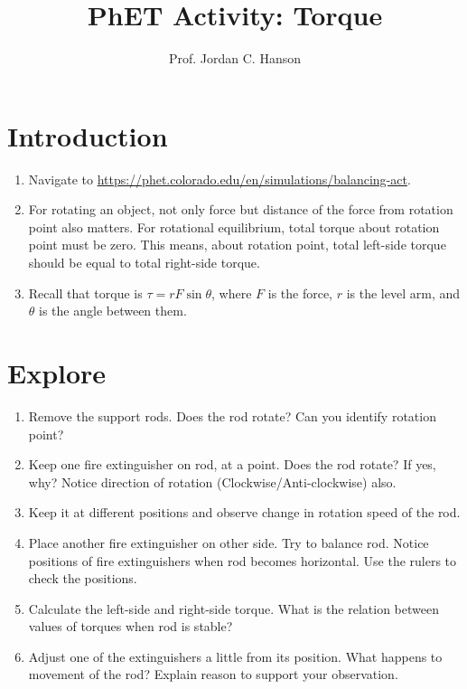 \documentclass{article}
\begin{document}
\title{PhET Activity: Torque}
\author{Prof. Jordan C. Hanson}

\maketitle

\section{Introduction}

\begin{enumerate}
\item Navigate to \url{https://phet.colorado.edu/en/simulations/balancing-act}.
\item For rotating an object, not only force but distance of the force from rotation point also matters. For rotational equilibrium, total torque about rotation point must be zero. This means, about rotation point, total left-side torque should be equal to total right-side torque.
\item Recall that torque is $\tau = r F\sin\theta$, where $F$ is the force, $r$ is the level arm, and $\theta$ is the angle between them.
\end{enumerate}

\section{Explore}

\begin{enumerate}
\item Remove the support rods. Does the rod rotate? Can you identify rotation point?
\item Keep one fire extinguisher on rod, at a point. Does the rod rotate? If yes, why? Notice direction of rotation (Clockwise/Anti-clockwise) also.
\item Keep it at different positions and observe change in rotation speed of the rod.
\item Place another fire extinguisher on other side. Try to balance rod. Notice positions of fire extinguishers when rod becomes horizontal.  Use the rulers to check the positions.
\item Calculate the left-side and right-side torque. What is the relation between values of torques when rod is stable?
\item Adjust one of the extinguishers a little from its position. What happens to movement of the rod? Explain reason to support your observation.
\end{enumerate}
\end{document}
